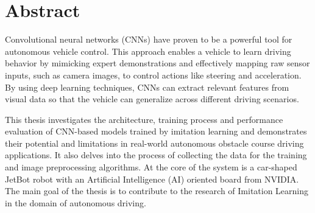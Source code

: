 \section*{Abstract}
\label{sec:Abstract}

Convolutional neural networks (CNNs) have proven to be a powerful tool for autonomous vehicle control. This approach enables a vehicle to learn driving behavior by mimicking expert demonstrations and effectively mapping raw sensor inputs, such as camera images, to control actions like steering and acceleration. By using deep learning techniques, CNNs can extract relevant features from visual data so that the vehicle can generalize across different driving scenarios.

This thesis investigates the architecture, training process and performance evaluation of CNN-based models trained by imitation learning and demonstrates their potential and limitations in real-world autonomous obstacle course driving applications. It also delves into the process of collecting the data for the training and image preprocessing algorithms. At the core of the system is a car-shaped JetBot robot with an Artificial Intelligence (AI) oriented board from NVIDIA. The main goal of the thesis is to contribute to the research of Imitation Learning in the domain of autonomous driving.